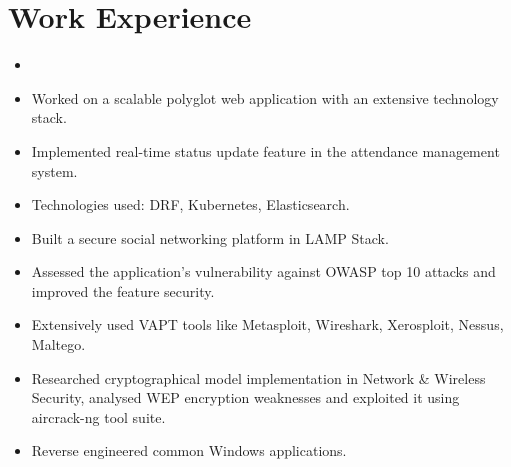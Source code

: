 \documentclass[10pt, margin=0.5in]{deedy-resume-openfont}
\begin{document}
\hfill
\begin{minipage}[t]{0.48\textwidth}

\vspace{-8pt}
\section{Work Experience}

\begin{itemize}[leftmargin=*, noitemsep]
  \item \lipsum[66]
\end{itemize}

\vspace{5pt}
\begin{itemize}[leftmargin=*, noitemsep]
  \item Worked on a scalable polyglot web application with an extensive technology stack.
  \item Implemented real-time status update feature in the attendance management system.
  \item Technologies used: DRF, Kubernetes, Elasticsearch.
\end{itemize}

\vspace{5pt}
\begin{itemize}[leftmargin=*, noitemsep]
  \item Built a secure social networking platform in LAMP Stack.
  \item Assessed the application's vulnerability against OWASP top 10 attacks and improved the feature security.
  \item Extensively used VAPT tools like Metasploit, Wireshark, Xerosploit, Nessus, Maltego.
  \item	Researched cryptographical model implementation in Network \& Wireless Security, analysed WEP encryption weaknesses and exploited it using aircrack-ng tool suite.
  \item Reverse engineered common Windows applications.
\end{itemize}



\end{minipage}
\end{document}
